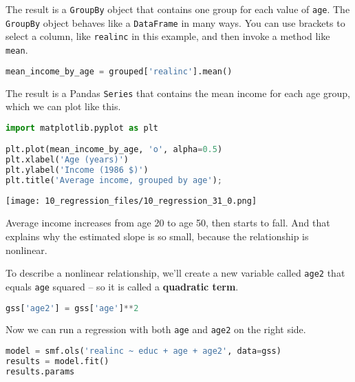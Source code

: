The result is a \passthrough{\lstinline!GroupBy!} object that contains
one group for each value of \passthrough{\lstinline!age!}. The
\passthrough{\lstinline!GroupBy!} object behaves like a
\passthrough{\lstinline!DataFrame!} in many ways. You can use brackets
to select a column, like \passthrough{\lstinline!realinc!} in this
example, and then invoke a method like \passthrough{\lstinline!mean!}.

\begin{lstlisting}[language=Python,style=source]
mean_income_by_age = grouped['realinc'].mean()
\end{lstlisting}

The result is a Pandas \passthrough{\lstinline!Series!} that contains
the mean income for each age group, which we can plot like this.

\begin{lstlisting}[language=Python,style=source]
import matplotlib.pyplot as plt

plt.plot(mean_income_by_age, 'o', alpha=0.5)
plt.xlabel('Age (years)')
plt.ylabel('Income (1986 $)')
plt.title('Average income, grouped by age');
\end{lstlisting}

\begin{center}
\texttt{[image: 10\_regression\_files/10\_regression\_31\_0.png]}
\end{center}

Average income increases from age 20 to age 50, then starts to fall. And
that explains why the estimated slope is so small, because the
relationship is nonlinear.

\pagebreak

To describe a nonlinear relationship, we'll
create a new variable called \passthrough{\lstinline!age2!} that equals
\passthrough{\lstinline!age!} squared -- so it is called a
\textbf{quadratic term}.

\begin{lstlisting}[language=Python,style=source]
gss['age2'] = gss['age']**2
\end{lstlisting}

Now we can run a regression with both \passthrough{\lstinline!age!} and
\passthrough{\lstinline!age2!} on the right side.

\begin{lstlisting}[language=Python,style=source]
model = smf.ols('realinc ~ educ + age + age2', data=gss)
results = model.fit()
results.params
\end{lstlisting}

